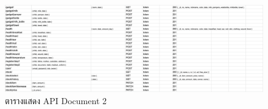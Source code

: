   \begin{landscape}
    \begin{figure}
      \begin{center}
        \includegraphics[width=\linewidth]{images/ApiDocTwo.png}
      \end{center}
      \caption[ตารางแสดง API Document 2]{ตารางแสดง API Document 2}
      \label{fig:ApiDocs2}
    \end{figure}
  \end{landscape}